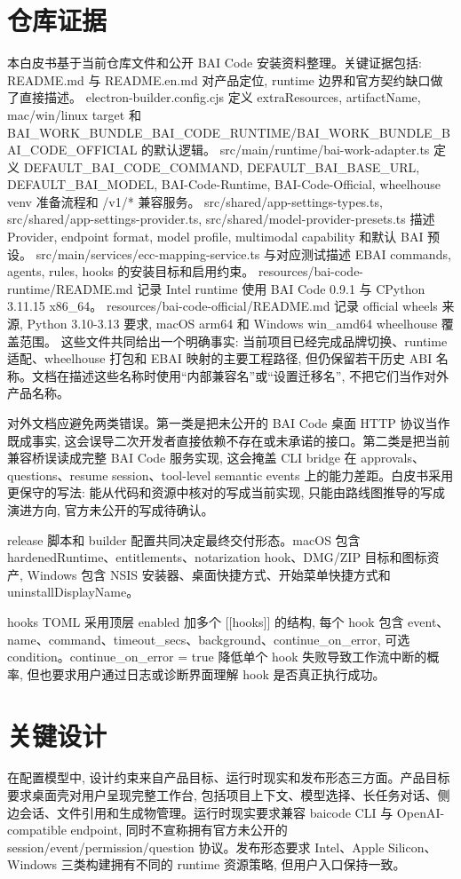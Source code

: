 \section{仓库证据}
本白皮书基于当前仓库文件和公开 BAI Code 安装资料整理。关键证据包括: README.md 与 README.en.md 对产品定位, runtime 边界和官方契约缺口做了直接描述。 electron-builder.config.cjs 定义 extraResources, artifactName, mac/win/linux target 和 BAI\_WORK\_BUNDLE\_BAI\_CODE\_RUNTIME/BAI\_WORK\_BUNDLE\_BAI\_CODE\_OFFICIAL 的默认逻辑。 src/main/runtime/bai-work-adapter.ts 定义 DEFAULT\_BAI\_CODE\_COMMAND, DEFAULT\_BAI\_BASE\_URL, DEFAULT\_BAI\_MODEL, BAI-Code-Runtime, BAI-Code-Official, wheelhouse venv 准备流程和 /v1/* 兼容服务。 src/shared/app-settings-types.ts, src/shared/app-settings-provider.ts, src/shared/model-provider-presets.ts 描述 Provider, endpoint format, model profile, multimodal capability 和默认 BAI 预设。 src/main/services/ecc-mapping-service.ts 与对应测试描述 EBAI commands, agents, rules, hooks 的安装目标和启用约束。 resources/bai-code-runtime/README.md 记录 Intel runtime 使用 BAI Code 0.9.1 与 CPython 3.11.15 x86\_64。 resources/bai-code-official/README.md 记录 official wheels 来源, Python 3.10-3.13 要求, macOS arm64 和 Windows win\_amd64 wheelhouse 覆盖范围。 这些文件共同给出一个明确事实: 当前项目已经完成品牌切换、runtime 适配、wheelhouse 打包和 EBAI 映射的主要工程路径, 但仍保留若干历史 ABI 名称。文档在描述这些名称时使用“内部兼容名”或“设置迁移名”, 不把它们当作对外产品名称。

对外文档应避免两类错误。第一类是把未公开的 BAI Code 桌面 HTTP 协议当作既成事实, 这会误导二次开发者直接依赖不存在或未承诺的接口。第二类是把当前兼容桥误读成完整 BAI Code 服务实现, 这会掩盖 CLI bridge 在 approvals、questions、resume session、tool-level semantic events 上的能力差距。白皮书采用更保守的写法: 能从代码和资源中核对的写成当前实现, 只能由路线图推导的写成演进方向, 官方未公开的写成待确认。

release 脚本和 builder 配置共同决定最终交付形态。macOS 包含 hardenedRuntime、entitlements、notarization hook、DMG/ZIP 目标和图标资产, Windows 包含 NSIS 安装器、桌面快捷方式、开始菜单快捷方式和 uninstallDisplayName。

hooks TOML 采用顶层 enabled 加多个 [[hooks]] 的结构, 每个 hook 包含 event、name、command、timeout\_secs、background、continue\_on\_error, 可选 condition。continue\_on\_error = true 降低单个 hook 失败导致工作流中断的概率, 但也要求用户通过日志或诊断界面理解 hook 是否真正执行成功。

\section{关键设计}
在配置模型中, 设计约束来自产品目标、运行时现实和发布形态三方面。产品目标要求桌面壳对用户呈现完整工作台, 包括项目上下文、模型选择、长任务对话、侧边会话、文件引用和生成物管理。运行时现实要求兼容 baicode CLI 与 OpenAI-compatible endpoint, 同时不宣称拥有官方未公开的 session/event/permission/question 协议。发布形态要求 Intel、Apple Silicon、Windows 三类构建拥有不同的 runtime 资源策略, 但用户入口保持一致。

